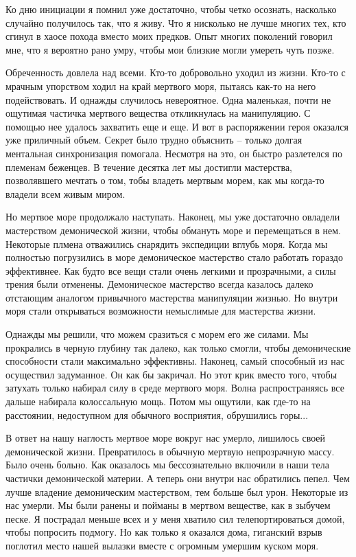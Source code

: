 \documentclass[12pt,a4paper]{article}
\begin{document}
Ко дню инициации я помнил уже достаточно, чтобы четко осознать, насколько случайно получилось так, что я живу. Что я нисколько не лучше многих тех, кто сгинул в хаосе похода вместо моих предков. Опыт многих поколений говорил мне, что я вероятно рано умру, чтобы мои близкие могли умереть чуть позже.

Обреченность довлела над всеми. Кто-то добровольно уходил из жизни. Кто-то с мрачным упорством ходил на край мертвого моря, пытаясь как-то на него подействовать. И однажды случилось невероятное. Одна маленькая, почти не ощутимая частичка мертвого вещества откликнулась на манипуляцию. С помощью нее удалось захватить еще и еще. И вот в распоряжении героя оказался уже приличный объем. Секрет было трудно объяснить -- только долгая ментальная синхронизация помогала. Несмотря на это, он быстро разлетелся по племенам беженцев. В течение десятка лет мы достигли мастерства, позволявшего мечтать о том, тобы владеть мертвым морем, как мы когда-то владели всем живым миром.

Но мертвое море продолжало наступать. Наконец, мы уже достаточно овладели мастерством демонической жизни, чтобы обмануть море и перемещаться в нем. Некоторые плмена отважились снарядить экспедиции вглубь моря. Когда мы полностью погрузились в море демоническое мастерство стало работать гораздо эффективнее. Как будто все вещи стали очень легкими и прозрачными, а силы трения были отменены. Демоническое мастерство всегда казалось далеко отстающим аналогом привычного мастерства манипуляции жизнью. Но внутри моря стали открываться возможности немыслимые для мастерства жизни.

Однажды мы решили, что можем сразиться с морем его же силами. Мы прокрались в черную глубину так далеко, как только смогли, чтобы демонические способности стали максимально эффективны. Наконец, самый способный из нас осуществил задуманное. Он как бы закричал. 
Но этот крик вместо того, чтобы затухать только набирал силу в среде мертвого моря. Волна распространяясь все дальше набирала колоссальную мощь. Потом мы ощутили, как где-то на расстоянии, недоступном для обычного восприятия, обрушились горы...

В ответ на нашу наглость мертвое море вокруг нас умерло, лишилось своей демонической жизни. Превратилось в обычную мертвую непрозрачную массу. Было очень больно. Как оказалось мы бессознательно включили в наши тела частички демонической материи. А теперь они внутри нас обратились пепел. Чем лучше владение демоническим мастерством, тем больше был урон. Некоторые из нас умерли. Мы были ранены и пойманы в мертвом веществе, как в зыбучем песке. Я пострадал меньше всех и у меня хватило сил телепортироваться домой, чтобы попросить подмогу. Но как только я оказался дома, гиганский взрыв поглотил место нашей вылазки вместе с огромным умершим куском моря.
\end{document}
